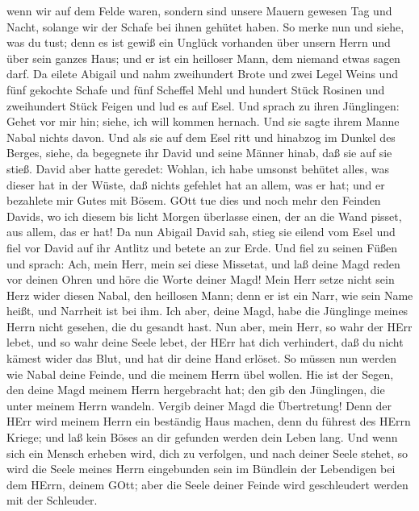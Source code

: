 wenn wir auf dem Felde waren,  sondern sind unsere Mauern
gewesen Tag und Nacht, solange wir der Schafe bei ihnen gehütet haben.
 So merke nun und siehe, was du tust; denn es ist gewiß ein
Unglück vorhanden über unsern Herrn und über sein ganzes Haus; und er
ist ein heilloser Mann, dem niemand etwas sagen darf.  Da
eilete Abigail und nahm zweihundert Brote und zwei Legel Weins und fünf
gekochte Schafe und fünf Scheffel Mehl und hundert Stück Rosinen und
zweihundert Stück Feigen und lud es auf Esel.  Und sprach
zu ihren Jünglingen: Gehet vor mir hin; siehe, ich will kommen hernach.
Und sie sagte ihrem Manne Nabal nichts davon.  Und als sie
auf dem Esel ritt und hinabzog im Dunkel des Berges, siehe, da begegnete
ihr David und seine Männer hinab, daß sie auf sie stieß. 
David aber hatte geredet: Wohlan, ich habe umsonst behütet alles, was
dieser hat in der Wüste, daß nichts gefehlet hat an allem, was er hat;
und er bezahlete mir Gutes mit Bösem.  GOtt tue dies und
noch mehr den Feinden Davids, wo ich diesem bis licht Morgen überlasse
einen, der an die Wand pisset, aus allem, das er hat!  Da
nun Abigail David sah, stieg sie eilend vom Esel und fiel vor David auf
ihr Antlitz und betete an zur Erde.  Und fiel zu seinen
Füßen und sprach: Ach, mein Herr, mein sei diese Missetat, und laß deine
Magd reden vor deinen Ohren und höre die Worte deiner Magd!
 Mein Herr setze nicht sein Herz wider diesen Nabal, den
heillosen Mann; denn er ist ein Narr, wie sein Name heißt, und Narrheit
ist bei ihm. Ich aber, deine Magd, habe die Jünglinge meines Herrn nicht
gesehen, die du gesandt hast.  Nun aber, mein Herr, so wahr
der HErr lebet, und so wahr deine Seele lebet, der HErr hat dich
verhindert, daß du nicht kämest wider das Blut, und hat dir deine Hand
erlöset. So müssen nun werden wie Nabal deine Feinde, und die meinem
Herrn übel wollen.  Hie ist der Segen, den deine Magd
meinem Herrn hergebracht hat; den gib den Jünglingen, die unter meinem
Herrn wandeln.  Vergib deiner Magd die Übertretung! Denn
der HErr wird meinem Herrn ein beständig Haus machen, denn du führest
des HErrn Kriege; und laß kein Böses an dir gefunden werden dein Leben
lang.  Und wenn sich ein Mensch erheben wird, dich zu
verfolgen, und nach deiner Seele stehet, so wird die Seele meines Herrn
eingebunden sein im Bündlein der Lebendigen bei dem HErrn, deinem GOtt;
aber die Seele deiner Feinde wird geschleudert werden mit der Schleuder.
